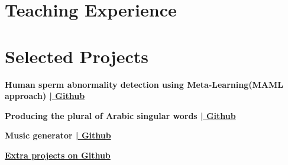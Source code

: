 \documentclass[letterpaper]{resume} %
\begin{document}
\begin{minipage}[t]{0.55\textwidth} %


\section{Teaching Experience}


\sectionspace %


\sectionspace %


\sectionspace %



\sectionspace %

\section{Selected Projects}
\vspace{\topsep} %
\begin{tightitemize}
\item {\bf Human sperm abnormality detection using Meta-Learning(MAML approach) \href{https://github.com/amirezzati/sperm-abnormality-detection-using-maml}{\bf | Github}}
\item {\bf Producing the plural of Arabic singular words \href{https://github.com/amirezzati/broken-plural}{\bf | Github}}
\item {\bf Music generator \href{https://github.com/amirezzati/music-generator}{\bf | Github}}
\item {\href{https://github.com/amirezzati}{\bf Extra projects on Github}}


\end{tightitemize}
\end{minipage}
\end{document}
